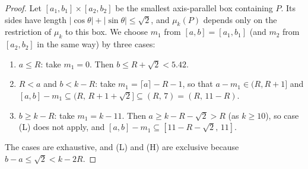 \documentclass[11pt]{amsart}
\theoremstyle{definition}
\theoremstyle{remark}
\begin{document}
\begin{proof}
Let $[a_1,b_1]\times[a_2,b_2]$ be the smallest axis-parallel box containing $P$. Its sides have length
$|\cos\theta|+|\sin\theta|\le\sqrt2$, and $\mu_k(P)$ depends only on the restriction of $\mu_k$ to this box. We
choose $m_1$ from $[a,b]=[a_1,b_1]$ (and $m_2$ from $[a_2,b_2]$ in the same way) by three cases:
\begin{enumerate}
\item[(L)] $a\le R$: take $m_1=0$. Then $b\le R+\sqrt2<5.42$.
\item[(M)] $R<a$ and $b<k-R$: take $m_1=\lceil a\rceil-R-1$, so that $a-m_1\in(R,R+1]$ and
$[a,b]-m_1\subseteq(R,\,R+1+\sqrt2]\subseteq(R,\,7)=(R,\,11-R)$.
\item[(H)] $b\ge k-R$: take $m_1=k-11$. Then $a\ge k-R-\sqrt2>R$ (as $k\ge10$), so case (L) does not apply, and
$[a,b]-m_1\subseteq[11-R-\sqrt2,\,11]$.
\end{enumerate}
The cases are exhaustive, and (L) and (H) are exclusive because $b-a\le\sqrt2<k-2R$.


\end{proof}
\end{document}
